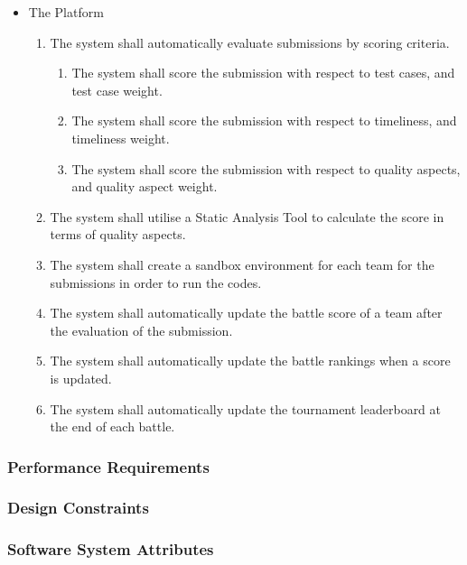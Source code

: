 \begin{itemize}
 \item The Platform
  \begin{enumerate}[resume]
     \item The system shall automatically evaluate submissions by scoring criteria.
     \begin{enumerate}
         \item The system shall score the submission with respect to test cases, and test case weight.
         \item The system shall score the submission with respect to timeliness, and timeliness weight.
         \item The system shall score the submission with respect to quality aspects, and quality aspect weight.
     \end{enumerate}
     \item The system shall utilise a Static Analysis Tool to calculate the score in terms of quality aspects.
     \item The system shall create a sandbox environment for each team for the submissions in order to run the codes.
     \item The system shall automatically update the battle score of a team after the evaluation of the submission.
     \item The system shall automatically update the battle rankings when a score is updated.
     \item The system shall automatically update the tournament leaderboard at the end of each battle.
 \end{enumerate}
 
\end{itemize}






\subsubsection{Performance Requirements}

\subsubsection{Design Constraints}

\subsubsection{Software System Attributes}



